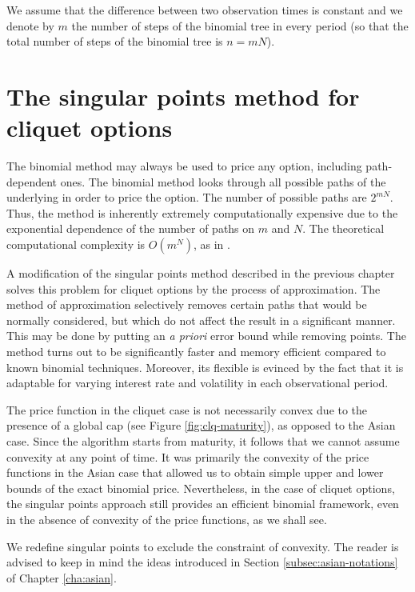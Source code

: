 We assume that the difference between two observation times is constant and we denote by $m$ the number of steps of the binomial tree in every period (so that the total number of steps of the binomial tree is $ n = m N $).



\section{The singular points method for cliquet options}
\label{sec:clq-sp}

The binomial method may always be used to price any option, including path-dependent ones. The binomial method looks through all possible paths of the underlying in order to price the option. The number of possible paths are $ 2 ^ {m N} $. Thus, the method is inherently extremely computationally expensive due to the exponential dependence of the number of paths on $m$ and $ N $. The theoretical computational complexity is $ O( m^{N} ) $, as in \cite[Page 128]{Gaudenzi2011}.

A modification of the singular points method described in the previous chapter solves this problem for cliquet options by the process of approximation. The method of approximation selectively removes certain paths that would be normally considered, but which do not affect the result in a significant manner. This may be done by putting an \emph{a priori} error bound while removing points. The method turns out to be significantly faster and memory efficient compared to known binomial techniques. Moreover, its flexible is evinced by the fact that it is adaptable for varying interest rate and volatility in each observational period.

The price function in the cliquet case is not necessarily convex due to the presence of a global cap (see Figure \ref{fig:clq-maturity}), as opposed to the Asian case. Since the algorithm starts from maturity, it follows that we cannot assume convexity at any point of time. It was primarily the convexity of the price functions in the Asian case that allowed us to obtain simple upper and lower bounds of the exact binomial price. Nevertheless, in the case of cliquet options, the singular points approach still provides an efficient binomial framework, even in the absence of convexity of the price functions, as we shall see.

We redefine singular points to exclude the constraint of convexity. The reader is advised to keep in mind the ideas introduced in Section \ref{subsec:asian-notations} of Chapter \ref{cha:asian}.

